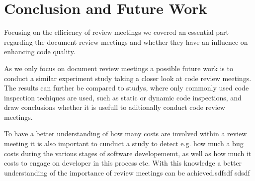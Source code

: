 \section{Conclusion and Future Work}

Focusing on the efficiency of review meetings we covered an essential part regarding the document review meetings and whether they have an influence on enhancing code quality.  

As we only focus on document review meetings a possible future work is to conduct a similar experiment study taking a closer look at code review meetings. The results can further be compared to studys, where only commonly used code inspection techiques are used, such as static or dynamic code inspections, and draw conclusions whether it is usefull to aditionally conduct code review meetings.   

To have a better understanding of how many costs are involved within a review meeting it is also important to cunduct a study to detect e.g. how much a bug costs during the various stages of software developememt, as well as how much it costs to engage on developer in this process etc. With this knowledge a better understanding of the importance of review meetings can be achieved.sdfsdf
sdsdf     
